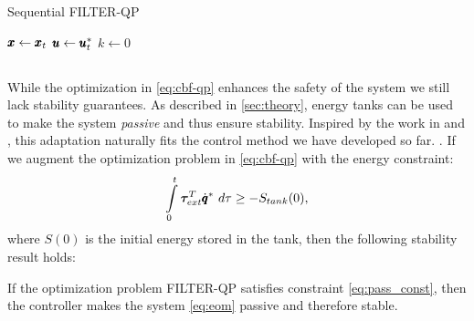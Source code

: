 \begin{algorithm}
\caption{Sequential FILTER-QP \label{algo:sequential_qp}}
$\pmb{x} \gets \pmb{x}_t$\;
$\pmb{u} \gets \pmb{u}^*_t$\;
$k \gets 0$\;
\end{algorithm}

\subsection{ }
While the optimization in \eqref{eq:cbf-qp} enhances the safety of the system we still lack stability guarantees. As described in \sect \ref{sec:theory}, energy tanks can be used to make the system \emph{passive} and thus ensure stability. Inspired by the work in \cite{benzi2021optimization} and \cite{shahriari2018valve}, this adaptation naturally fits the control method we have developed so far. . 
If we augment the optimization problem in \eqref{eq:cbf-qp} with the energy constraint:
\begin{equation}\label{eq:pass_const}
    \int\limits_{0}^{t} \boldsymbol{\tau}_{ext}^T \dconfigRobotDesired \ d\tau \geq -S_{tank}(0),
\end{equation}
where $S(0)$ is the initial energy stored in the tank, then the following stability result holds:

\begin{theorem}
If the optimization problem FILTER-QP satisfies constraint \eqref{eq:pass_const}, then the controller makes the system \eqref{eq:eom} passive and therefore stable. 
\end{theorem}

